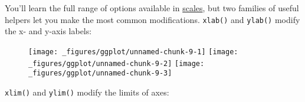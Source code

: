 
You'll learn the full range of options available in
\hyperref[cha:scales]{scales}, but two families of useful helpers let
you make the most common modifications. \texttt{xlab()} and
\texttt{ylab()} modify the x- and y-axis labels: 

\begin{Shaded}
\begin{Highlighting}[]
\StringTok{  }\NormalTok{(}  \NormalTok{/}\StringTok{ }\NormalTok{)}

\StringTok{  }\NormalTok{(}  \NormalTok{/}\StringTok{ }\NormalTok{) +}\StringTok{ }
\StringTok{  }\NormalTok{(}\NormalTok{) +}\StringTok{ }
\StringTok{  }\NormalTok{(}\NormalTok{)}

\StringTok{  }\NormalTok{(}  \NormalTok{/}\StringTok{ }\NormalTok{) +}\StringTok{ }
\StringTok{  }\NormalTok{(}\NormalTok{) +}\StringTok{ }
\StringTok{  }\NormalTok{(}\NormalTok{)}
\end{Highlighting}
\end{Shaded}

\begin{figure}[H]
  \texttt{[image: \_figures/ggplot/unnamed-chunk-9-1]}%
  \texttt{[image: \_figures/ggplot/unnamed-chunk-9-2]}%
  \texttt{[image: \_figures/ggplot/unnamed-chunk-9-3]}
\end{figure}

\texttt{xlim()} and \texttt{ylim()} modify the limits of axes:
 

